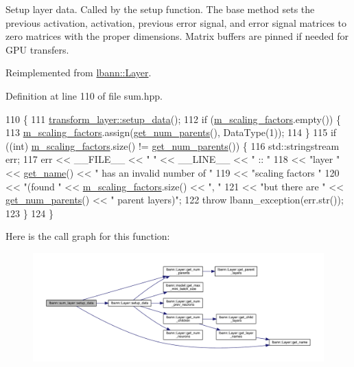 Setup layer data. Called by the setup function. The base method sets the previous activation, activation, previous error signal, and error signal matrices to zero matrices with the proper dimensions. Matrix buffers are pinned if needed for G\+PU transfers. 

Reimplemented from \hyperlink{classlbann_1_1Layer_a50a89f8a68762c677d48efe384676e81}{lbann\+::\+Layer}.



Definition at line 110 of file sum.\+hpp.


\begin{DoxyCode}
110                              \{
111     \hyperlink{classlbann_1_1Layer_a50a89f8a68762c677d48efe384676e81}{transform\_layer::setup\_data}();
112     \textcolor{keywordflow}{if} (\hyperlink{classlbann_1_1sum__layer_a371ae9038d8654fbca134e0f61e1e29a}{m\_scaling\_factors}.empty()) \{
113       \hyperlink{classlbann_1_1sum__layer_a371ae9038d8654fbca134e0f61e1e29a}{m\_scaling\_factors}.assign(\hyperlink{classlbann_1_1Layer_ac9290d4a6453ccda5f6b4d8b57b49ba3}{get\_num\_parents}(), DataType(1));
114     \}
115     \textcolor{keywordflow}{if} ((\textcolor{keywordtype}{int}) \hyperlink{classlbann_1_1sum__layer_a371ae9038d8654fbca134e0f61e1e29a}{m\_scaling\_factors}.size() != \hyperlink{classlbann_1_1Layer_ac9290d4a6453ccda5f6b4d8b57b49ba3}{get\_num\_parents}()) \{
116       std::stringstream err;
117       err << \_\_FILE\_\_ << \textcolor{stringliteral}{" "} << \_\_LINE\_\_ << \textcolor{stringliteral}{" :: "}
118           << \textcolor{stringliteral}{"layer "} << \hyperlink{classlbann_1_1Layer_a80027550202fa7dbb1dd55fa8a66c84b}{get\_name}() << \textcolor{stringliteral}{" has an invalid number of "}
119           << \textcolor{stringliteral}{"scaling factors "}
120           << \textcolor{stringliteral}{"(found "} << \hyperlink{classlbann_1_1sum__layer_a371ae9038d8654fbca134e0f61e1e29a}{m\_scaling\_factors}.size() << \textcolor{stringliteral}{", "}
121           << \textcolor{stringliteral}{"but there are "} << \hyperlink{classlbann_1_1Layer_ac9290d4a6453ccda5f6b4d8b57b49ba3}{get\_num\_parents}() << \textcolor{stringliteral}{" parent layers)"};
122       \textcolor{keywordflow}{throw} lbann\_exception(err.str());
123     \}
124   \}
\end{DoxyCode}
Here is the call graph for this function\+:\nopagebreak
\begin{figure}[H]
\begin{center}
\leavevmode
\includegraphics[width=350pt]{classlbann_1_1sum__layer_a9f8659993a180f1bb1a8bd875814d33b_cgraph}
\end{center}
\end{figure}
